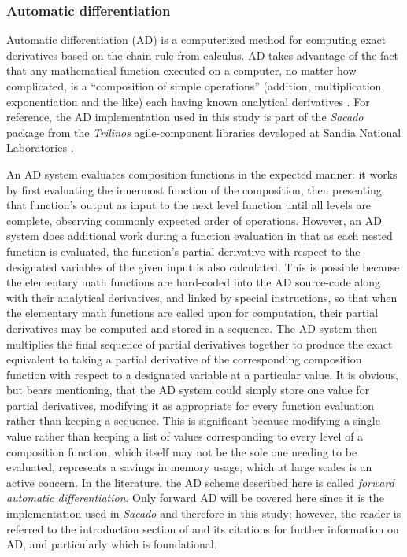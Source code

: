 \documentclass[preprint,12pt]{elsarticle}
\begin{document}
\subsubsection{Automatic differentiation} 
\label{ADsubsection}

Automatic differentiation (AD) is a computerized method for computing exact derivatives based on the chain-rule from calculus. AD takes advantage of the fact that any mathematical function executed on a computer, no matter how complicated, is a ``composition of simple operations'' (addition, multiplication, exponentiation and the like) each having known analytical derivatives \cite{ref-sacado-presentation}. For reference, the AD implementation used in this study is part of the \emph{Sacado} package from the \emph{Trilinos} agile-component libraries developed at Sandia National Laboratories \cite{ref-Sacado}.

An AD system evaluates composition functions in the expected manner: it works by first evaluating the innermost function of the composition, then presenting that function's output as input to the next level function until all levels are complete, observing commonly expected order of operations. However, an AD system does additional work during a function evaluation in that as each nested function is evaluated, the function's partial derivative with respect to the designated variables of the given input is also calculated.  This is possible because the elementary math functions are hard-coded into the AD source-code along with their analytical derivatives, and linked by special instructions, so that when the elementary math functions are called upon for computation, their partial derivatives may be computed and stored in a sequence. The AD system then multiplies the final sequence of partial derivatives together to produce the exact equivalent to taking a partial derivative of the corresponding composition function with respect to a designated variable at a particular value. 
%
It is obvious, but bears mentioning, that the AD system could simply store one value for partial derivatives, modifying it as appropriate for every function evaluation rather than keeping a sequence. This is significant because modifying a single value rather than keeping a list of values corresponding to every level of a composition function, which itself may not be the sole one needing to be evaluated, represents a savings in memory usage, which at large scales is an active concern. In the literature, the AD scheme described here is called \emph{forward automatic differentiation}. Only forward AD will be covered here since it is the implementation used in \emph{Sacado} and therefore in this study; however, the reader is referred to the introduction section of \cite{ref-AD-methods} and its citations for further information on AD, and
particularly \cite{ref-on-AD} which is foundational.
\end{document}

